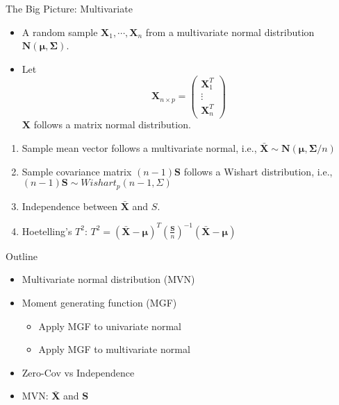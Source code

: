 \documentclass[
  ignorenonframetext,
]{beamer}
\providecommand{\tightlist}{%
  \setlength{\itemsep}{0pt}\setlength{\parskip}{0pt}}
\begin{document}
\begin{frame}{The Big Picture: Multivariate}
\protect\hypertarget{the-big-picture-multivariate}{}
\begin{itemize}
\tightlist
\item
  A random sample \(\mathbf X_1, \cdots, \mathbf X_n\) from a
  multivariate normal distribution
  \(\mathbf N(\boldsymbol \mu, \boldsymbol \Sigma)\).
\item
  Let \[\mathbf X_{n\times p}=\begin{pmatrix}
  \mathbf X_1^T \\ \vdots \\\mathbf X_n^T
  \end{pmatrix}\] \(\mathbf X\) follows a matrix normal distribution.
\end{itemize}

\begin{enumerate}
\item
  Sample mean vector follows a multivariate normal, i.e.,
  \(\bar{\mathbf X} \sim \mathbf N(\boldsymbol \mu, \boldsymbol \Sigma/n)\)
\item
  Sample covariance matrix \((n-1)\mathbf S\) follows a Wishart
  distribution, i.e., \((n-1)\mathbf S \sim Wishart_p (n-1, \Sigma)\)
\item
  Independence between \(\bar {\mathbf X}\) and \(S\).
\item
  Hoetelling's \(T^2\):
  \(T^2 = (\bar{\mathbf X} - \boldsymbol \mu)^T\left(\frac{\mathbf S}{n}\right)^{-1} (\bar{\mathbf X} - \boldsymbol \mu)\)
\end{enumerate}
\end{frame}

\begin{frame}{Outline}
\protect\hypertarget{outline}{}
\begin{itemize}
\tightlist
\item
  Multivariate normal distribution (MVN)
\item
  Moment generating function (MGF)

  \begin{itemize}
  \tightlist
  \item
    Apply MGF to univariate normal
  \item
    Apply MGF to multivariate normal
  \end{itemize}
\item
  Zero-Cov vs Independence
\item
  MVN: \(\bar{\mathbf X}\) and \(\mathbf S\)
\end{itemize}
\end{frame}
\end{document}
